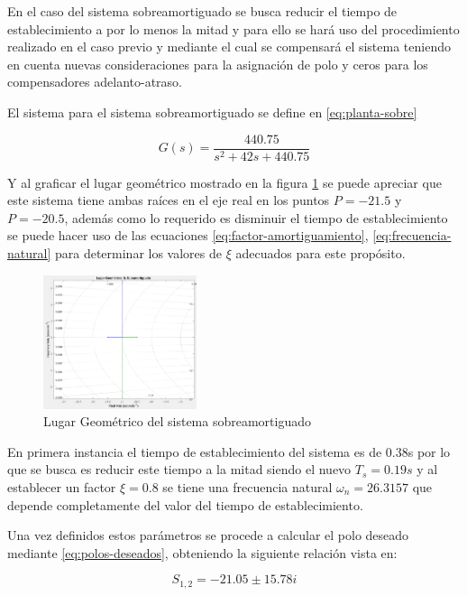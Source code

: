 \documentclass[conference]{IEEEtran}
\begin{document}
	En el caso del sistema sobreamortiguado se busca reducir el tiempo de establecimiento a por lo menos la mitad y para ello se hará uso del procedimiento realizado en el caso previo y mediante el cual se compensará el sistema teniendo en cuenta nuevas consideraciones para la asignación de polo y ceros para los compensadores adelanto-atraso.
	
	El sistema para el sistema sobreamortiguado se define en \ref{eq:planta-sobre}
	
	\begin{equation}
		G(s) = \frac{440.75}{s^2 + 42s + 440.75}
		\label{eq:planta-sobre}
	\end{equation}
	
	Y al graficar el lugar geométrico mostrado en la figura \ref{fig:lgr-planta-sobre} se puede apreciar que este sistema tiene ambas raíces en el eje real en los puntos $P = -21.5$ y $P = -20.5$, además como lo requerido es disminuir el tiempo de establecimiento se puede hacer uso de las ecuaciones \ref{eq:factor-amortiguamiento}, \ref{eq:frecuencia-natural} para determinar los valores de $\xi$ adecuados para este propósito.
	
	\begin{figure}[h]
		\centering
		\includegraphics[width=0.4\textwidth]{media/lgr-planta-sobre}
		\caption{Lugar Geométrico del sistema sobreamortiguado}
		\label{fig:lgr-planta-sobre}
	\end{figure}
	
	En primera instancia el tiempo de establecimiento del sistema es de 0.38s por lo que se busca es reducir este tiempo a la mitad siendo el nuevo $T_s = 0.19s$ y al establecer un factor $\xi = 0.8$ se tiene una frecuencia natural $\omega_n = 26.3157$ que depende completamente del valor del tiempo de establecimiento.
	
	Una vez definidos estos parámetros se procede a calcular el polo deseado mediante \ref{eq:polos-deseados}, obteniendo la siguiente relación vista en: 
	
	\begin{equation}
		S_{1, 2} = -21.05 \pm 15.78i
		\label{eq:polos-deseados-sobre}
	\end{equation}
	
\end{document}
